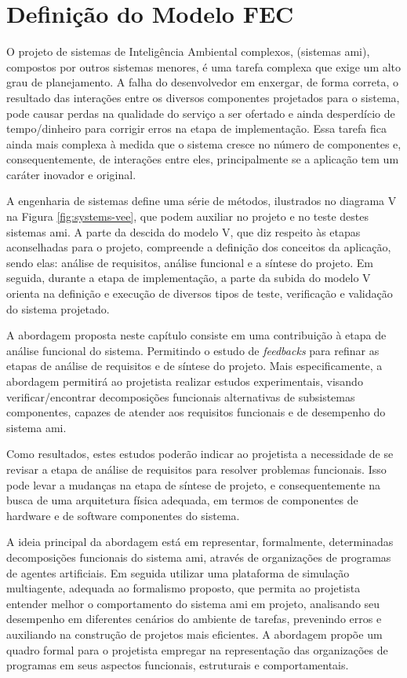 \chapter{Definição do Modelo FEC} %
\label{cap:abordagem}

    O projeto de sistemas de Inteligência Ambiental complexos, (sistemas \acrshort{ami}), compostos por outros sistemas menores, é uma tarefa complexa que exige um alto grau de planejamento. A falha do desenvolvedor em enxergar, de forma correta, o resultado das interações entre os diversos componentes projetados para o sistema, pode causar perdas na qualidade do serviço a ser ofertado e ainda desperdício de tempo/dinheiro para corrigir erros na etapa de implementação. Essa tarefa fica ainda mais complexa à medida que o sistema cresce no número de componentes e, consequentemente, de interações entre eles, principalmente se a aplicação tem um caráter inovador e original.

    A engenharia de sistemas define uma série de métodos, ilustrados no diagrama V na Figura \ref{fig:systems-vee}, que podem auxiliar no projeto e no teste destes sistemas \acrshort{ami}. A parte da descida do modelo V, que diz respeito às etapas aconselhadas para o projeto, compreende a definição dos conceitos da aplicação, sendo elas: análise de requisitos, análise funcional e a síntese do projeto. Em seguida, durante a etapa de implementação, a parte da subida do modelo V orienta na definição e execução de diversos tipos de teste, verificação e validação do sistema projetado. 

    A abordagem proposta neste capítulo consiste em uma contribuição à etapa de análise funcional do sistema. Permitindo o estudo de \textit{feedbacks} para refinar as etapas de análise de requisitos e de síntese do projeto. Mais especificamente, a abordagem permitirá ao projetista realizar estudos experimentais, visando verificar/encontrar decomposições funcionais alternativas de subsistemas componentes, capazes de atender aos requisitos funcionais e de desempenho do sistema \acrshort{ami}. 
    
    Como resultados, estes estudos poderão indicar ao projetista a necessidade de se revisar a etapa de análise de requisitos para resolver problemas funcionais. Isso pode levar a mudanças na etapa de síntese de projeto, e consequentemente na busca de uma arquitetura física adequada, em termos de componentes de hardware e de software componentes do sistema. 
    
    A ideia principal da abordagem está em representar, formalmente, determinadas decomposições funcionais do sistema \acrshort{ami}, através de organizações de programas de agentes artificiais. Em seguida utilizar uma plataforma de simulação multiagente, adequada ao formalismo proposto, que permita ao projetista entender melhor o comportamento do sistema \acrshort{ami} em projeto, analisando seu desempenho em diferentes cenários do ambiente de tarefas, prevenindo erros e auxiliando na construção de projetos mais eficientes. A abordagem propõe um quadro formal para o projetista empregar na representação das organizações de programas em seus aspectos funcionais, estruturais e comportamentais.
    
